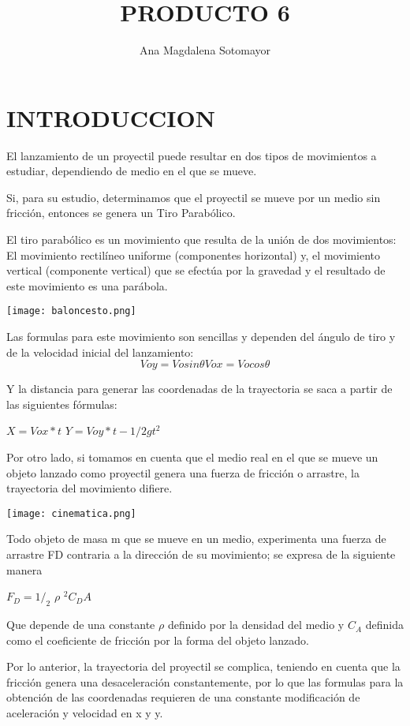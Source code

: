 \documentclass[letterpaper,10pt,twoside,onecolumn]{article}
\begin{document}
 
\title{PRODUCTO 6}

\author{Ana Magdalena Sotomayor} 

\maketitle 
\section{INTRODUCCION}
El lanzamiento de un proyectil puede resultar en dos tipos de movimientos a estudiar, dependiendo de medio en el que se mueve.

Si, para su estudio, determinamos que el proyectil se mueve por un medio sin fricción, entonces se genera un Tiro Parabólico.

El tiro parabólico es un movimiento que resulta de la unión de dos movimientos: El movimiento rectilíneo uniforme (componentes horizontal) y, el movimiento vertical (componente vertical) que se efectúa por la gravedad y el resultado de este movimiento es una parábola. 

\texttt{[image: baloncesto.png]}

Las formulas para este movimiento son sencillas y dependen del ángulo de tiro y de la velocidad inicial del lanzamiento:
\begin{equation}
Voy = Vo sin \theta
Vox = Vo cos \theta
 \end{equation}

Y la distancia para generar las coordenadas de la trayectoria se saca a partir de las siguientes fórmulas:

$X= Vox*t$
$Y= Voy*t-1/2gt^2$

Por otro lado, si tomamos en cuenta que el medio real en el que se mueve un objeto lanzado como proyectil genera una fuerza de fricción o arrastre, la trayectoria del movimiento difiere.

\texttt{[image: cinematica.png]}

Todo objeto de masa m que se mueve en un medio, experimenta una fuerza de arrastre FD contraria a la dirección de su movimiento; se expresa de la siguiente manera

$ F_D = 1/_2$ $\rho$ $^2C_DA$

Que depende de una constante $\rho$ definido por la densidad del medio y $C_A$ definida como el coeficiente de fricción por la forma del objeto lanzado.

Por lo anterior, la trayectoria del proyectil se complica, teniendo en cuenta que la fricción genera una desaceleración constantemente, por lo que las formulas para la obtención de las coordenadas requieren de una constante modificación de aceleración y velocidad en x y y.
\end{document}

